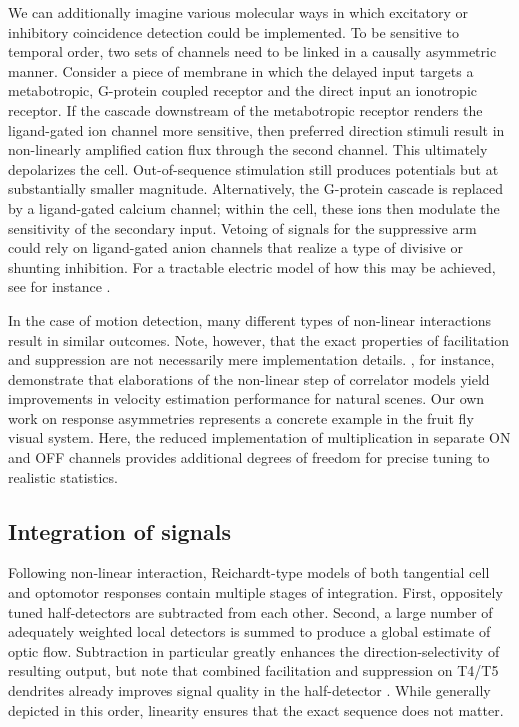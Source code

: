We can additionally imagine various molecular ways in which excitatory or inhibitory coincidence detection could be implemented. To be sensitive to temporal order, two sets of channels need to be linked in a causally asymmetric manner. Consider a piece of membrane in which the delayed input targets a metabotropic, G-protein coupled receptor and the direct input an ionotropic receptor. If the cascade downstream of the metabotropic receptor renders the ligand-gated ion channel more sensitive, then preferred direction stimuli result in non-linearly amplified cation flux through the second channel. This ultimately depolarizes the cell. Out-of-sequence stimulation still produces potentials but at substantially smaller magnitude. Alternatively, the G-protein cascade is replaced by a ligand-gated calcium channel; within the cell, these ions then modulate the sensitivity of the secondary input. Vetoing of signals for the suppressive arm could rely on ligand-gated anion channels that realize a type of divisive or shunting inhibition. For a tractable electric model of how this may be achieved, see for instance \citet{Torre:1978vp}.

In the case of motion detection, many different types of non-linear interactions result in similar outcomes. Note, however, that the exact properties of facilitation and suppression are not necessarily mere implementation details. \citet{Fitzgerald:2015aa}, for instance, demonstrate that elaborations of the non-linear step of correlator models yield improvements in velocity estimation performance for natural scenes. Our own work on response asymmetries represents a concrete example in the fruit fly visual system. Here, the reduced implementation of multiplication in separate ON and OFF channels provides additional degrees of freedom for precise tuning to realistic statistics.

\subsection{Integration of signals}
Following non-linear interaction, Reichardt-type models of both tangential cell and optomotor responses contain multiple stages of integration. First, oppositely tuned half-detectors are subtracted from each other. Second, a large number of adequately weighted local detectors is summed to produce a global estimate of optic flow. Subtraction in particular greatly enhances the direction-selectivity of resulting output, but note that combined facilitation and suppression on T4/T5 dendrites already improves signal quality in the half-detector \citep{Borst:1990wu,Haag:2016cq}. While generally depicted in this order, linearity ensures that the exact sequence does not matter.

